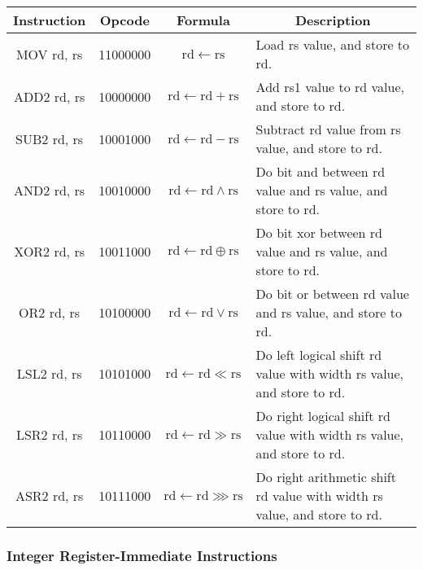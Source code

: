 \documentclass[a4paper,10pt]{article}
\begin{document}
\begin{center}
    \begin{tabularx}{\textwidth}{|c|c|c|X|} \hline
      Instruction & Opcode & Formula & \multicolumn{1}{c|}{Description} \\ \hline \hline
      MOV rd, rs  & 11000000 & $\mathrm{rd} \leftarrow \mathrm{rs}$ &
      Load rs value, and store to rd. \\ \hline
      ADD2 rd, rs & 10000000 & $\mathrm{rd} \leftarrow \mathrm{rd} + \mathrm{rs}$ &
      Add rs1 value to rd value, and store to rd.  \\ \hline
      SUB2 rd, rs & 10001000 & $\mathrm{rd} \leftarrow \mathrm{rd} - \mathrm{rs}$ &
      Subtract rd value from rs value, and store to rd.  \\ \hline
      AND2 rd, rs & 10010000 & $\mathrm{rd} \leftarrow \mathrm{rd} \land \mathrm{rs}$ &
      Do bit and between rd value and rs value, and store to rd.  \\ \hline
      XOR2 rd, rs & 10011000 & $\mathrm{rd} \leftarrow \mathrm{rd} \oplus \mathrm{rs}$ &
      Do bit xor between rd value and rs value, and store to rd.  \\ \hline
      OR2  rd, rs & 10100000 & $\mathrm{rd} \leftarrow \mathrm{rd} \lor \mathrm{rs}$ &
      Do bit or between rd value and rs value, and store to rd.  \\ \hline
      LSL2 rd, rs & 10101000 & $\mathrm{rd} \leftarrow \mathrm{rd} \ll \mathrm{rs}$ &
      Do left logical shift rd value with width rs value, and store to rd.  \\ \hline
      LSR2 rd, rs & 10110000 & $\mathrm{rd} \leftarrow \mathrm{rd} \gg \mathrm{rs}$ &
      Do right logical shift rd value with width rs value, and store to rd.  \\ \hline
      ASR2 rd, rs & 10111000 & $\mathrm{rd} \leftarrow \mathrm{rd} \ggg \mathrm{rs}$ &
      Do right arithmetic shift rd value with width rs value, and store to rd.  \\ \hline
    \end{tabularx}
\end{center}

\subsubsection*{Integer Register-Immediate Instructions}
\end{document}
